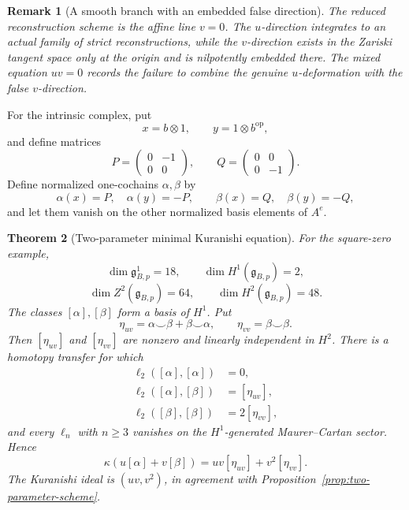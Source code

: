 \documentclass[11pt]{amsart}
\newtheorem{theorem}{Theorem}[section]
\newtheorem{remark}[theorem]{Remark}
\newcommand{\ghoch}{\mathfrak g}
\begin{document}
\begin{remark}[A smooth branch with an embedded false direction]
The reduced reconstruction scheme is the affine line $v=0$.  The $u$-direction integrates to an actual family of strict reconstructions, while the $v$-direction exists in the Zariski tangent space only at the origin and is nilpotently embedded there.  The mixed equation $uv=0$ records the failure to combine the genuine $u$-deformation with the false $v$-direction.
\end{remark}

For the intrinsic complex, put
\[
x=b\otimes1,
\qquad
y=1\otimes b^{\mathrm{op}},
\]
and define matrices
\[
P=
\begin{pmatrix}0&-1\\0&0\end{pmatrix},
\qquad
Q=
\begin{pmatrix}0&0\\0&-1\end{pmatrix}.
\]
Define normalized one-cochains $\alpha,\beta$ by
\[
\alpha(x)=P,
\quad
\alpha(y)=-P,
\qquad
\beta(x)=Q,
\quad
\beta(y)=-Q,
\]
and let them vanish on the other normalized basis elements of $A^e$.

\begin{theorem}[Two-parameter minimal Kuranishi equation]\label{thm:two-parameter-kuranishi}
For the square-zero example,
\[
\dim\ghoch^1_{B,p}=18,
\qquad
\dim H^1(\ghoch_{B,p})=2,
\]
\[
\dim Z^2(\ghoch_{B,p})=64,
\qquad
\dim H^2(\ghoch_{B,p})=48.
\]
The classes $[\alpha],[\beta]$ form a basis of $H^1$.  Put
\[
\eta_{uv}=\alpha\smile\beta+\beta\smile\alpha,
\qquad
\eta_{vv}=\beta\smile\beta.
\]
Then $[\eta_{uv}]$ and $[\eta_{vv}]$ are nonzero and linearly independent in $H^2$.  There is a homotopy transfer for which
\begin{align*}
\ell_2([\alpha],[\alpha])&=0,\\
\ell_2([\alpha],[\beta])&=[\eta_{uv}],\\
\ell_2([\beta],[\beta])&=2[\eta_{vv}],
\end{align*}
and every $\ell_n$ with $n\ge3$ vanishes on the $H^1$-generated Maurer--Cartan sector.  Hence
\[
\boxed{
\kappa(u[\alpha]+v[\beta])
=
uv[\eta_{uv}]+v^2[\eta_{vv}].
}
\]
The Kuranishi ideal is $(uv,v^2)$, in agreement with Proposition~\ref{prop:two-parameter-scheme}.
\end{theorem}
\end{document}
